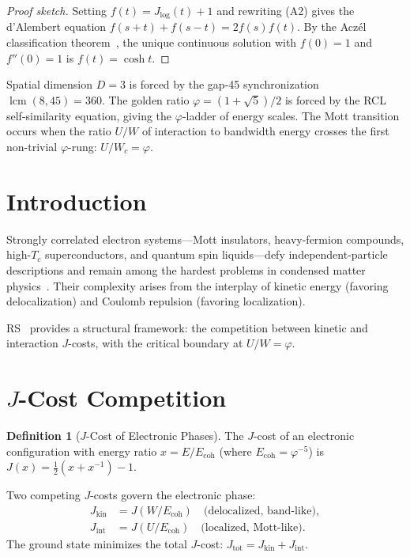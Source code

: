 \documentclass[12pt,a4paper]{article}
\theoremstyle{definition}
\newtheorem{definition}[theorem]{Definition}
\theoremstyle{remark}
\begin{document}
\begin{proof}[Proof sketch]
Setting $f(t) = J_{\log}(t) + 1$ and rewriting \textup{(A2)} gives the
d'Alembert equation $f(s+t) + f(s-t) = 2f(s)f(t)$.  By the Acz\'el
classification theorem~\cite{Aczel1966}, the unique continuous solution
with $f(0) = 1$ and $f''(0) = 1$ is $f(t) = \cosh t$.
\end{proof}

\noindent Spatial dimension $D = 3$ is forced by the gap-45
synchronization $\operatorname{lcm}(8,45)=360$.  The golden ratio
$\varphi = (1+\sqrt{5})/2$ is forced by the RCL self-similarity
equation, giving the $\varphi$-ladder of energy scales.  The Mott
transition occurs when the ratio $U/W$ of interaction to bandwidth
energy crosses the first non-trivial $\varphi$-rung: $U/W_c = \varphi$.

\section{Introduction}
\label{sec:intro}

Strongly correlated electron systems---Mott insulators,
heavy-fermion compounds, high-$T_c$ superconductors, and quantum
spin liquids---defy independent-particle descriptions and remain
among the hardest problems in condensed matter
physics~\cite{Imada1998}.  Their complexity arises from the
interplay of kinetic energy (favoring delocalization) and Coulomb
repulsion (favoring localization).

RS~\cite{RS_Axioms} provides a structural framework: the competition
between kinetic and interaction $J$-costs, with the critical boundary
at $U/W = \varphi$.

\section{$J$-Cost Competition}
\label{sec:cost}

\begin{definition}[$J$-Cost of Electronic Phases]
\label{def:cost}
The $J$-cost of an electronic configuration with energy ratio
$x = E/E_{\mathrm{coh}}$ (where
$E_{\mathrm{coh}} = \varphi^{-5}$) is
$J(x) = \tfrac{1}{2}(x + x^{-1}) - 1$.

Two competing $J$-costs govern the electronic phase:
\begin{align}
  J_{\mathrm{kin}} &= J(W/E_{\mathrm{coh}})
  \quad \text{(delocalized, band-like)}, \\
  J_{\mathrm{int}} &= J(U/E_{\mathrm{coh}})
  \quad \text{(localized, Mott-like)}.
\end{align}
The ground state minimizes the total $J$-cost:
$J_{\mathrm{tot}} = J_{\mathrm{kin}} + J_{\mathrm{int}}$.
\end{definition}
\end{document}
